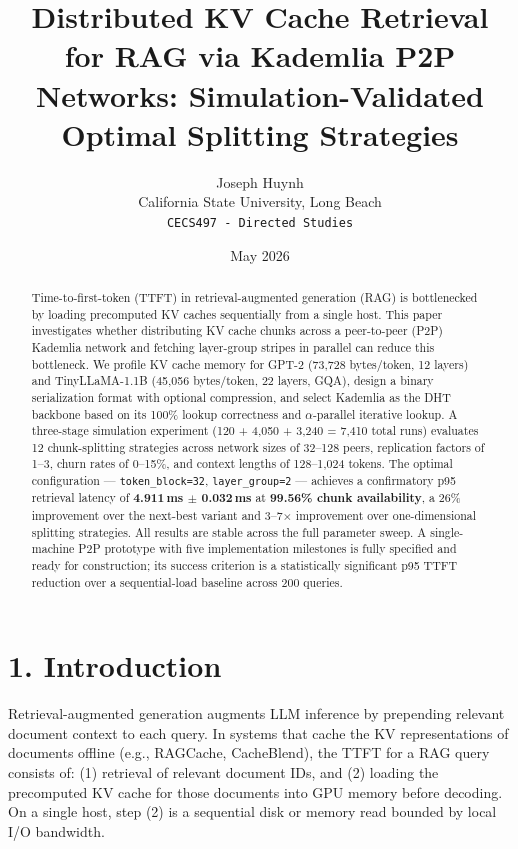 \documentclass[11pt]{article}
\title{\textbf{Distributed KV Cache Retrieval for RAG via Kademlia P2P Networks:
Simulation-Validated Optimal Splitting Strategies}}
\author{Joseph Huynh\\
  California State University, Long Beach\\
  \texttt{CECS497 - Directed Studies}}
\date{May 2026}
\begin{document}
\maketitle

\begin{abstract}
Time-to-first-token (TTFT) in retrieval-augmented generation (RAG) is
bottlenecked by loading precomputed KV caches sequentially from a single
host. This paper investigates whether distributing KV cache chunks
across a peer-to-peer (P2P) Kademlia network and fetching layer-group
stripes in parallel can reduce this bottleneck. We profile KV cache
memory for GPT-2 (73,728 bytes/token, 12 layers) and TinyLLaMA-1.1B
(45,056 bytes/token, 22 layers, GQA), design a binary serialization
format with optional compression, and select Kademlia as the DHT
backbone based on its 100\% lookup correctness and $\alpha$-parallel iterative
lookup. A three-stage simulation experiment (120 + 4,050 + 3,240 = 7,410
total runs) evaluates 12 chunk-splitting strategies across network sizes
of 32--128 peers, replication factors of 1--3, churn rates of 0--15\%,
and context lengths of 128--1,024 tokens. The optimal configuration ---
\texttt{token\_block=32}, \texttt{layer\_group=2} --- achieves a confirmatory p95
retrieval latency of \textbf{4.911\,ms $\pm$ 0.032\,ms} at \textbf{99.56\%
chunk availability}, a 26\% improvement over the next-best variant and
3--7$\times$ improvement over one-dimensional splitting strategies. All results
are stable across the full parameter sweep. A single-machine P2P
prototype with five implementation milestones is fully specified and
ready for construction; its success criterion is a statistically
significant p95 TTFT reduction over a sequential-load baseline across
200 queries.
\end{abstract}

\section{1. Introduction}

Retrieval-augmented generation augments LLM inference by prepending
relevant document context to each query. In systems that cache the KV
representations of documents offline (e.g., RAGCache, CacheBlend), the
TTFT for a RAG query consists of: (1) retrieval of relevant document
IDs, and (2) loading the precomputed KV cache for those documents into
GPU memory before decoding. On a single host, step (2) is a sequential
disk or memory read bounded by local I/O bandwidth.
\end{document}
